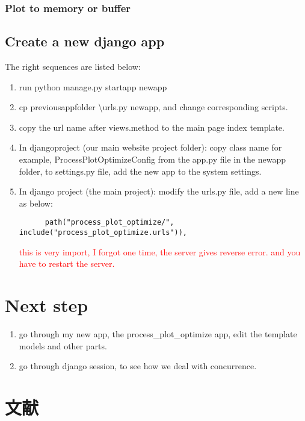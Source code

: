\documentclass[UTF8,fancyhdr,a4paper]{ctexart}
\newcommand{\pflred}[1]{\textcolor{red}{#1}}
\begin{document}
\subsubsection{Plot to memory or buffer}

\subsection{Create a new django app}
The right sequences are listed below:
\begin{enumerate}
      \item run python manage.py startapp newapp
      \item cp previous\textunderscore app\textunderscore folder \textbackslash urls.py newapp, and change corresponding scripts.
      \item copy the url name after views.method to the main page index template.
      \item In django\textunderscore project (our main website project folder): copy class name for example, ProcessPlotOptimizeConfig from the app.py file in the newapp folder, to settings.py file, add the new app to the system settings.
      \item In django \textunderscore project (the main project): modify the urls.py file, add a new line as below: \begin{verbatim}
      path("process_plot_optimize/", include("process_plot_optimize.urls")),
      \end{verbatim} \pflred{this is very import, I forgot one time, the server gives reverse error. and you have to restart the server.}
\end{enumerate}




\section{Next step}
\begin{enumerate}
      \item go through my new app, the process\_plot\_optimize app, edit the template models and other parts.
      \item go through django session, to see how we deal with concurrence.
\end{enumerate}















\newpage
\section{文献}
\cite{10cm}


\end{document}
